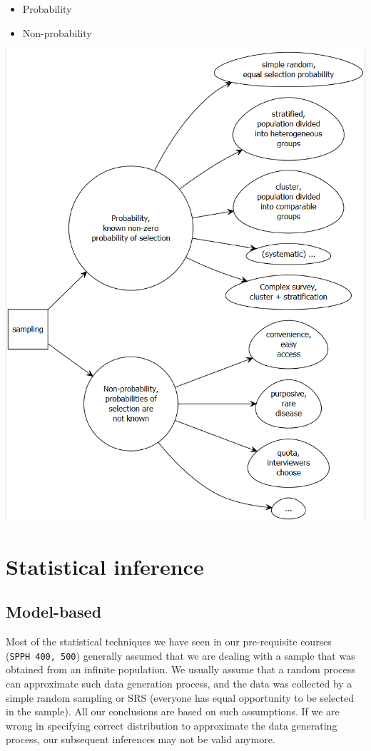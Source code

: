 \documentclass[
]{book}
\providecommand{\tightlist}{%
  \setlength{\itemsep}{0pt}\setlength{\parskip}{0pt}}
\begin{document}
\begin{itemize}
\tightlist
\item
  Probability
\item
  Non-probability
\end{itemize}

\includegraphics[width=0.85\linewidth]{images/sampling1}

\hypertarget{statistical-inference}{%
\section{Statistical inference}\label{statistical-inference}}

\hypertarget{model-based}{%
\subsection{Model-based}\label{model-based}}

Most of the statistical techniques we have seen in our pre-requisite courses (\texttt{SPPH\ 400,\ 500}) generally assumed that we are dealing with a sample that was obtained from an infinite population. We usually assume that a random process can approximate such data generation process, and the data was collected by a simple random sampling or SRS (everyone has equal opportunity to be selected in the sample). All our conclusions are based on such assumptions. If we are wrong in specifying correct distribution to approximate the data generating process, our subsequent inferences may not be valid anymore.
\end{document}

